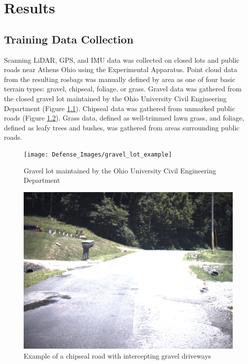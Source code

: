 \documentclass[numbered,pdftex]{ohio-etd}
\begin{document}
\chapter{Results}{
	
	\section{Training Data Collection}\label{sec:training-data-collection}{
	
		{Scanning LiDAR, GPS, and IMU data was collected on closed lots and public roads near Athens Ohio using the Experimental Apparatus. Point cloud data from the resulting rosbags was manually defined by area as one of four basic terrain types: gravel, chipseal, foliage, or grass. Gravel data was gathered from the closed gravel lot maintained by the Ohio University Civil Engineering Department (Figure \ref{fig:gravel_lot_example}). Chipseal data was gathered from unmarked public roads (Figure \ref{fig:chipseal_road_example}). Grass data, defined as well-trimmed lawn grass, and foliage, defined as leafy trees and bushes, was gathered from areas surrounding public roads. }
		
		\begin{figure}[H]
			\centering
			\texttt{[image: Defense\_Images/gravel\_lot\_example]}
			\caption[Example of Gravel Road]{Gravel lot maintained by the Ohio University Civil Engineering Department}
			\label{fig:gravel_lot_example}
		\end{figure}
		
		\begin{figure}[H]
			\centering
			\includegraphics[width=0.7\linewidth]{Defense_Images/chipseal_road_example}
			\caption[Example of Chipseal Road]{Example of a chipseal road with intercepting gravel driveways}
			\label{fig:chipseal_road_example}
		\end{figure}
	
}}
\end{document}
